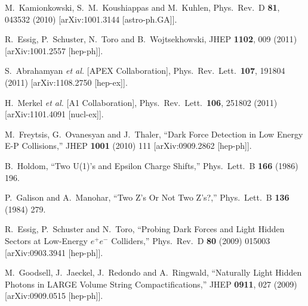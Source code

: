 
  M.~Kamionkowski, S.~M.~Koushiappas and M.~Kuhlen,
  Phys.\ Rev.\ D {\bf 81}, 043532 (2010)
  [arXiv:1001.3144 [astro-ph.GA]].


  R.~Essig, P.~Schuster, N.~Toro and B.~Wojtsekhowski,
  JHEP {\bf 1102}, 009 (2011)
  [arXiv:1001.2557 [hep-ph]].

  S.~Abrahamyan {\it et al.}  [APEX Collaboration],
  Phys.\ Rev.\ Lett.\  {\bf 107}, 191804 (2011)
  [arXiv:1108.2750 [hep-ex]].

  H.~Merkel {\it et al.}  [A1 Collaboration],
  Phys.\ Rev.\ Lett.\  {\bf 106}, 251802 (2011)
  [arXiv:1101.4091 [nucl-ex]].

M.~Freytsis, G.~Ovanesyan and J.~Thaler,
``Dark Force Detection in Low Energy E-P Collisions,''
JHEP {\bf 1001} (2010) 111
[arXiv:0909.2862 [hep-ph]].

B.~Holdom,
``Two U(1)'s and Epsilon Charge Shifts,''
Phys.\ Lett.\ B {\bf 166} (1986) 196.

P.~Galison and A.~Manohar,
``Two Z's Or Not Two Z's?,''
Phys.\ Lett.\ B {\bf 136} (1984) 279.

R.~Essig, P.~Schuster and N.~Toro,
``Probing Dark Forces and Light Hidden Sectors at Low-Energy $e^+e^-$ Colliders,''
Phys.\ Rev.\ D {\bf 80} (2009) 015003
[arXiv:0903.3941 [hep-ph]].

 M.~Goodsell, J.~Jaeckel, J.~Redondo and A.~Ringwald,
 ``Naturally Light Hidden Photons in LARGE Volume String Compactifications,''
 JHEP {\bf 0911}, 027 (2009)
 [arXiv:0909.0515 [hep-ph]].
 
